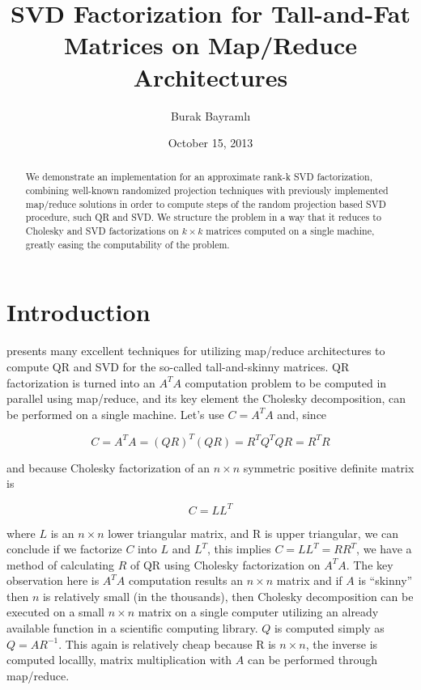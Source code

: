 \documentclass[11pt]{article}
\begin{document}
\title{SVD Factorization for Tall-and-Fat Matrices on Map/Reduce
  Architectures} \author{Burak Bayramlı} \date{October 15, 2013}

\maketitle

\begin{abstract}
  We demonstrate an implementation for an approximate rank-k SVD
  factorization, combining well-known randomized projection techniques with
  previously implemented map/reduce solutions in order to compute steps of
  the random projection based SVD procedure, such QR and SVD. We structure
  the problem in a way that it reduces to Cholesky and SVD factorizations
  on $k \times k$ matrices computed on a single machine, greatly easing the
  computability of the problem.
\end{abstract}

\section{Introduction} \label{intro}

\cite{gleich} presents many excellent techniques for utilizing map/reduce
architectures to compute QR and SVD for the so-called tall-and-skinny
matrices. QR factorization is turned into an $A^TA$ computation problem to
be computed in parallel using map/reduce, and its key element the Cholesky
decomposition, can be performed on a single machine. Let's use $C = A^TA$
and, since

$$ C = A^TA = (QR)^T(QR) = R^TQ^TQR = R^TR $$

and because Cholesky factorization of an $n \times n$ symmetric positive
definite matrix is

$$ C = LL^T $$

where $L$ is an $n \times n$ lower triangular matrix, and R is upper
triangular, we can conclude if we factorize $C$ into $L$ and $L^T$, this
implies $C = LL^T = RR^T$, we have a method of calculating $R$ of QR using
Cholesky factorization on $A^TA$. The key observation here is $A^TA$
computation results an $n \times n$ matrix and if $A$ is ``skinny'' then
$n$ is relatively small (in the thousands), then Cholesky decomposition can
be executed on a small $n \times n$ matrix on a single computer utilizing
an already available function in a scientific computing library. $Q$ is
computed simply as $Q = AR^{-1}$. This again is relatively cheap because R
is $n \times n$, the inverse is computed locallly, matrix multiplication
with $A$ can be performed through map/reduce.
\end{document}
